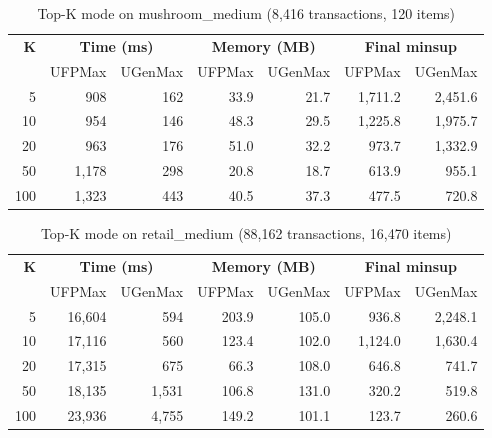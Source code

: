 \documentclass[12pt,a4paper]{report}
\begin{document}
\begin{table}[h]
\centering
\caption{Top-K mode on mushroom\_medium (8,416 transactions, 120 items)}
\label{tab:topk_mushroom}
\begin{tabular}{rrrrrrr}
\toprule
\textbf{K} & \multicolumn{2}{c}{\textbf{Time (ms)}} & \multicolumn{2}{c}{\textbf{Memory (MB)}} & \multicolumn{2}{c}{\textbf{Final minsup}} \\
 & UFPMax & UGenMax & UFPMax & UGenMax & UFPMax & UGenMax \\
\midrule
5 & 908 & 162 & 33.9 & 21.7 & 1,711.2 & 2,451.6 \\
10 & 954 & 146 & 48.3 & 29.5 & 1,225.8 & 1,975.7 \\
20 & 963 & 176 & 51.0 & 32.2 & 973.7 & 1,332.9 \\
50 & 1,178 & 298 & 20.8 & 18.7 & 613.9 & 955.1 \\
100 & 1,323 & 443 & 40.5 & 37.3 & 477.5 & 720.8 \\
\bottomrule
\end{tabular}
\end{table}

\begin{table}[h]
\centering
\caption{Top-K mode on retail\_medium (88,162 transactions, 16,470 items)}
\label{tab:topk_retail}
\begin{tabular}{rrrrrrr}
\toprule
\textbf{K} & \multicolumn{2}{c}{\textbf{Time (ms)}} & \multicolumn{2}{c}{\textbf{Memory (MB)}} & \multicolumn{2}{c}{\textbf{Final minsup}} \\
 & UFPMax & UGenMax & UFPMax & UGenMax & UFPMax & UGenMax \\
\midrule
5 & 16,604 & 594 & 203.9 & 105.0 & 936.8 & 2,248.1 \\
10 & 17,116 & 560 & 123.4 & 102.0 & 1,124.0 & 1,630.4 \\
20 & 17,315 & 675 & 66.3 & 108.0 & 646.8 & 741.7 \\
50 & 18,135 & 1,531 & 106.8 & 131.0 & 320.2 & 519.8 \\
100 & 23,936 & 4,755 & 149.2 & 101.1 & 123.7 & 260.6 \\
\bottomrule
\end{tabular}
\end{table}
\end{document}
